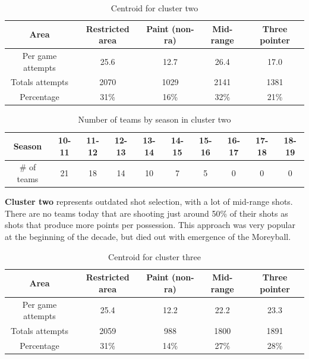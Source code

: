 \documentclass[a4paper]{article}
\begin{document}
\begin{table}[!h]
\begin{center}
\begin{tabular}{|c|c|c|c|c|} \hline
Area & Restricted area & Paint (non-ra) & Mid-range & Three pointer \\ \hline
Per game attempts & 25.6 & 12.7 & 26.4 & 17.0  \\ \hline
Totals attempts & 2070 & 1029 & 2141 & 1381  \\ \hline
Percentage & 31\% & 16\% & 32\% & 21\% \\ \hline
\end{tabular}
\caption{Centroid for cluster two}
\label{tab:clust_shooting_by_teams_centr2}
\end{center}
\end{table}

\begin{table}[!h]
\begin{tabular}{|c|c|c|c|c|c|c|c|c|c|} \hline
Season & 10-11 & 11-12 & 12-13 & 13-14 & 14-15 & 15-16 & 16-17 & 17-18 & 18-19 \\ \hline
\# of teams & 21 & 18 & 14 & 10 & 7 & 5 & 0 & 0 & 0 \\ \hline
\end{tabular}
\caption{Number of teams by season in cluster two}
\label{tab:clust_shooting_by_teams_num2}
\end{table}

\textbf{Cluster two }represents outdated shot selection, with a lot of mid-range shots. There are no teams today that are shooting just around 50\% of their shots as shots that produce more points per possession. This approach was very popular at the beginning of the decade, but died out with emergence of the Moreyball.

\begin{table}[!h]
\begin{center}
\begin{tabular}{|c|c|c|c|c|} \hline
Area & Restricted area & Paint (non-ra) & Mid-range & Three pointer \\ \hline
Per game attempts & 25.4 & 12.2 & 22.2 & 23.3  \\ \hline
Totals attempts & 2059 & 988 & 1800 & 1891  \\ \hline
Percentage & 31\% & 14\% & 27\% & 28\% \\ \hline
\end{tabular}
\caption{Centroid for cluster three}
\label{tab:clust_shooting_by_teams_centr3}
\end{center}
\end{table}
\end{document}
